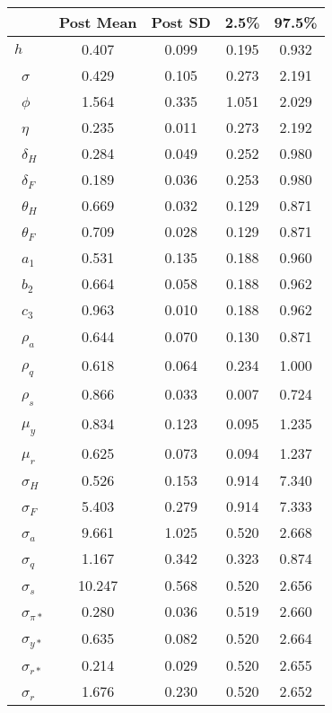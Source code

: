 \begin{tiny}\begin{tabular}{lcccc}
\hline
&\textbf{Post Mean}&\textbf{Post SD}&\textbf{2.5\%}&\textbf{97.5\%}\\\hline
\textbf{$ h             $}&0.407&0.099&0.195&0.932\\\
\textbf{$ \sigma        $}&0.429&0.105&0.273&2.191\\\
\textbf{$ \phi          $}&1.564&0.335&1.051&2.029\\\
\textbf{$ \eta          $}&0.235&0.011&0.273&2.192\\\
\textbf{$ \delta_{H}    $}&0.284&0.049&0.252&0.980\\\
\textbf{$ \delta_{F}    $}&0.189&0.036&0.253&0.980\\\
\textbf{$ \theta_{H}    $}&0.669&0.032&0.129&0.871\\\
\textbf{$ \theta_{F}    $}&0.709&0.028&0.129&0.871\\\
\textbf{$ a_{1}         $}&0.531&0.135&0.188&0.960\\\
\textbf{$ b_{2}         $}&0.664&0.058&0.188&0.962\\\
\textbf{$ c_{3}         $}&0.963&0.010&0.188&0.962\\\
\textbf{$ \rho_{a}      $}&0.644&0.070&0.130&0.871\\\
\textbf{$ \rho_{q}      $}&0.618&0.064&0.234&1.000\\\
\textbf{$ \rho_{s}      $}&0.866&0.033&0.007&0.724\\\
\textbf{$ \mu_{y}       $}&0.834&0.123&0.095&1.235\\\
\textbf{$ \mu_{r}       $}&0.625&0.073&0.094&1.237\\\
\textbf{$ \sigma_{H}    $}&0.526&0.153&0.914&7.340\\\
\textbf{$ \sigma_{F}    $}&5.403&0.279&0.914&7.333\\\
\textbf{$ \sigma_{a}    $}&9.661&1.025&0.520&2.668\\\
\textbf{$ \sigma_{q}    $}&1.167&0.342&0.323&0.874\\\
\textbf{$ \sigma_{s}    $}&10.247&0.568&0.520&2.656\\\
\textbf{$ \sigma_{\pi*} $}&0.280&0.036&0.519&2.660\\\
\textbf{$ \sigma_{y*}   $}&0.635&0.082&0.520&2.664\\\
\textbf{$ \sigma_{r*}   $}&0.214&0.029&0.520&2.655\\\
\textbf{$ \sigma_{r}    $}&1.676&0.230&0.520&2.652\\\hline
\end{tabular}
\end{tiny}